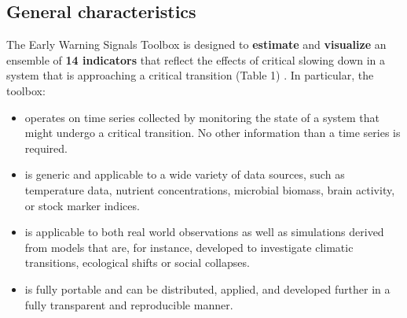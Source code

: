 \documentclass[12pt,a4paper,final]{article}
\begin{document}
\begin{doublespacing}
\subsection{General characteristics}
The Early Warning Signals Toolbox is designed to \textbf{estimate} and \textbf{visualize} an ensemble of \textbf{14 indicators} that reflect the effects of critical slowing down in a system that is approaching a critical transition (Table 1) \cite{Dakos2012a}. In particular, the toolbox:
\begin{itemize}
\item operates on time series collected by monitoring the state of a system that might undergo a critical transition. No other information than a time series is required. 
\item is generic and applicable to a wide variety of data sources, such as temperature data, nutrient concentrations, microbial biomass, brain activity, or stock marker indices.
\item is applicable to both real world observations as well as simulations derived from models that are, for instance, developed to investigate climatic transitions, ecological shifts or social collapses.
\item is fully portable and can be distributed, applied, and developed further in a fully transparent and reproducible manner.
\end{itemize}



\end{doublespacing}
\end{document}
